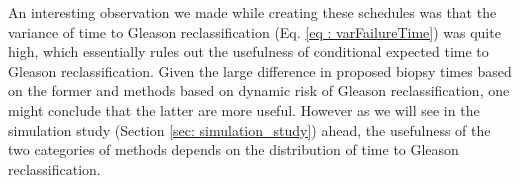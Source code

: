 An interesting observation we made while creating these schedules was that the variance of time to Gleason reclassification (Eq. \ref{eq : varFailureTime}) was quite high, which essentially rules out the usefulness of conditional expected time to Gleason reclassification. Given the large difference in proposed biopsy times based on the former and methods based on dynamic risk of Gleason reclassification, one might conclude that the latter are more useful. However as we will see in the simulation study (Section \ref{sec: simulation_study}) ahead, the usefulness of the two categories of methods depends on the distribution of time to Gleason reclassification.
